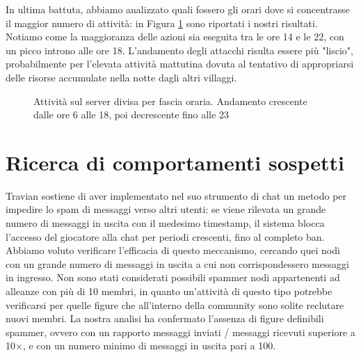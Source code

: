 In ultima battuta, abbiamo analizzato quali fossero gli orari dove si concentrasse il maggior numero di attività: in Figura \ref{fig:activity_players} sono riportati i nostri risultati. Notiamo come la maggioranza delle azioni sia eseguita tra le ore 14 e le 22, con un picco introno alle ore 18. L'andamento degli attacchi risulta essere più "liscio", probabilmente per l'elevata attività mattutina dovuta al tentativo di appropriarsi delle risorse accumulate nella notte dagli altri villaggi.\\
\begin{figure}
	\hfill
	\caption{Attività sul server divisa per fascia oraria. Andamento crescente dalle ore 6 alle 18, poi decrescente fino alle 23}
	\label{fig:activity_players}
\end{figure}


\section{Ricerca di comportamenti sospetti}
Travian sostiene di aver implementato nel suo strumento di chat un metodo per impedire lo spam di messaggi verso altri utenti: se viene rilevata un grande numero di messaggi in uscita con il medesimo timestamp, il sistema blocca l'accesso del giocatore alla chat per periodi crescenti, fino al completo ban.\\
Abbiamo voluto verificare l'efficacia di questo meccanismo, cercando quei nodi con un grande numero di messaggi in uscita a cui non corrispondessero messaggi in ingresso.
Non sono stati considerati possibili spammer nodi appartenenti ad alleanze con più di 10 membri, in quanto un'attività di questo tipo potrebbe verificarsi per quelle figure che all'interno della community sono solite reclutare nuovi membri.
La nostra analisi ha confermato l'assenza di figure definibili spammer, ovvero con un rapporto messaggi inviati / messaggi ricevuti superiore a 10$\times$, e con un numero minimo di messaggi in uscita pari a 100.

